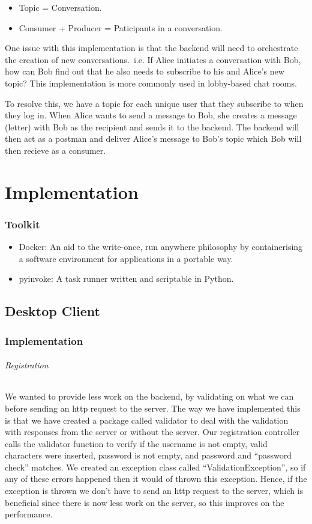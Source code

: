 \documentclass[11pt,a4paper]{report}
\begin{document}
\begin{itemize}
  \item Topic = Conversation.
  \item Consumer + Producer = Paticipants in a conversation.
\end{itemize}

One issue with this implementation is that the backend will need to orchestrate the creation of new conversations.\ i.e. If Alice initiates a conversation with Bob, how can Bob find out that he also needs to subscribe to his and Alice's new topic? This implementation is more commonly used in lobby-based chat rooms.

To resolve this, we have a topic for each unique user that they subscribe to when they log in. When Alice wants to send a message to Bob, she creates a message (letter) with Bob as the recipient and sends it to the backend. The backend will then act as a postman and deliver Alice's message to Bob's topic which Bob will then recieve as a consumer.

\chapter{Implementation}

\subsection{Toolkit}

\begin{itemize}
  \item Docker: An aid to the write-once, run anywhere philosophy by containerising a software environment for applications in a portable way.
  \item pyinvoke: A task runner written and scriptable in Python.
\end{itemize}

\section{Desktop Client}

\subsection{Implementation}

\subparagraph{Registration}
We wanted to provide less work on the backend, by validating on what we can before sending an http request to the server. The way we have implemented this is that we have created a package called validator to deal with the validation with responses from the server or without the server. Our registration controller calls the validator function to verify if the username is not empty, valid characters were inserted, password is not empty, and password and “password check” matches. We created an exception class called “ValidationException”, so if any of these errors happened then it would of thrown this exception. Hence, if the exception is thrown we don’t have to send an http request to the server, which is beneficial since there is now less work on the server, so this improves on the performance.
\end{document}
